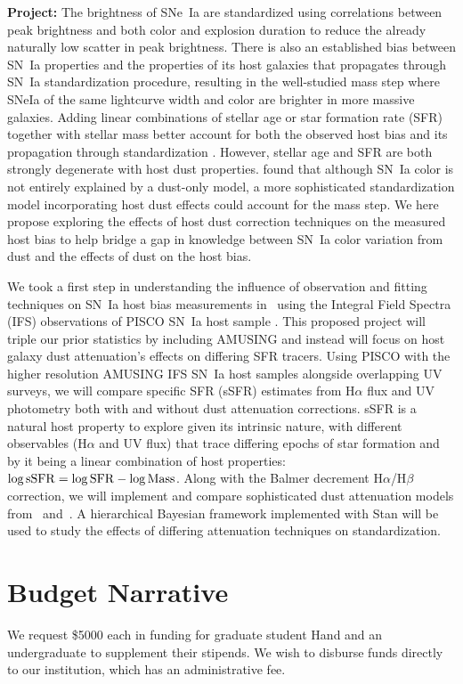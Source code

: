 \documentclass[modern]{aastex63}
\begin{document}
{\bf Project:}
The brightness of SNe~Ia are standardized using correlations between peak brightness and both color and explosion duration to reduce the already naturally low scatter in peak brightness.
There is also an established bias between SN~Ia properties and the properties of its host galaxies that propagates through SN~Ia standardization procedure, resulting in the well-studied mass step \citep{Sullivan2010} where SNeIa of the same lightcurve width and color are brighter in more massive galaxies.
Adding linear combinations of stellar age or star formation rate (SFR) together with stellar mass better account for both the observed host bias and its propagation through standardization \citep{Rigault2018,Rose2021}.
However, stellar age and SFR are both strongly degenerate with host dust properties.
\cite{Brout2021} found that although SN~Ia color is not entirely explained by a dust-only model, a more sophisticated standardization model incorporating host dust effects could account for the mass step.
We here propose exploring the effects of host dust correction techniques on the measured host bias to help bridge a gap in knowledge between SN~Ia color variation from dust and the effects of dust on the host bias.

We took a first step in understanding the influence of observation and fitting techniques on SN~Ia host bias measurements in~\cite{Hand2021} using the Integral Field Spectra (IFS) observations of PISCO SN~Ia host sample \citep{Galbany2018}.  
This proposed project will triple our prior statistics by including AMUSING \citep{Galbany2016a} and instead will focus on host galaxy dust attenuation's effects on differing SFR tracers. 
Using PISCO with the higher resolution AMUSING IFS SN~Ia host samples alongside overlapping UV surveys, we will compare specific SFR (sSFR) estimates from H$\alpha$ flux and UV photometry both with and without dust attenuation corrections.
sSFR is a natural host property to explore given its intrinsic nature, with different observables (H$\alpha$ and UV flux) that trace differing epochs of star formation and by it being a linear combination of host properties: $\log{\rm sSFR} = \log{\rm SFR} - \log{\rm Mass}$.
Along with the Balmer decrement H$\alpha$/H$\beta$ correction, we will implement and compare sophisticated dust attenuation models from~\cite{Salim2018} and~\cite{Narayanan2018}.  
A hierarchical Bayesian framework implemented with Stan will be used to study the effects of differing attenuation techniques on standardization.

\section{Budget Narrative}
We request \$5000 each in funding for graduate student Hand and an undergraduate to supplement their stipends.  We wish to disburse funds directly to our institution, which has an administrative fee.



\end{document}
